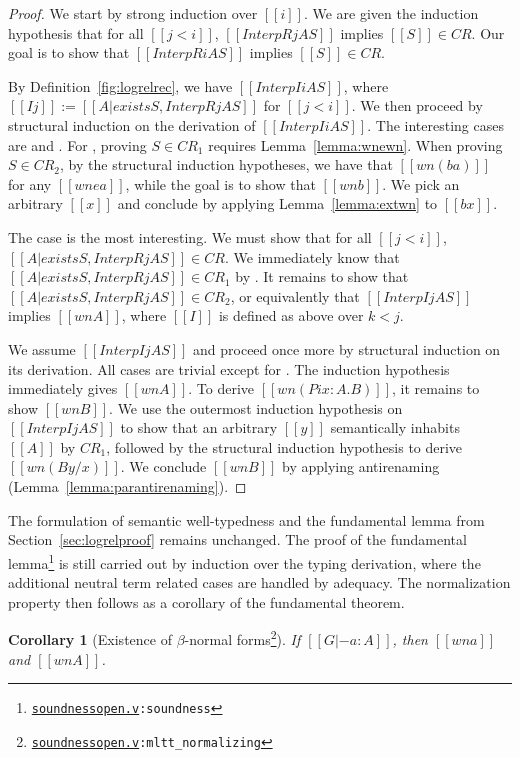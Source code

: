 \documentclass[\ifpublic nolinenum\else\fi,online,OA]{jfp}
\newcommand{\dotv}[2]{\href{#1}{\texttt{#1}}{\texttt{:#2}}}
\newcommand{\CR}{\mathit{CR}}
\newtheorem{corollary}[theorem]{Corollary}
\theoremstyle{definition}
\begin{document}
\begin{proof}
  We start by strong induction over $[[i]]$. We are given the
  induction hypothesis that for all $[[j < i]]$, $[[InterpR j A S]]$
  implies $[[S]] \in \CR$. Our goal is to show that $[[InterpR i A S]]$
  implies $[[S]] \in \CR$.

  By Definition~\ref{fig:logrelrec}, we have $[[Interp I i A S]]$,
  where $[[I j]] := [[{A | exists S , InterpR j A S}]]$ for $[[j < i]]$.
  We then proceed by structural induction on the derivation of
  $[[Interp I i A S]]$. The interesting cases are  and .
  For , proving $S \in \CR_1$ requires Lemma~\ref{lemma:wnewn}. When
  proving $S \in \CR_2$, by the structural induction hypotheses, we have that
  $[[wn (b a)]]$ for any $[[wne a]]$, while the goal is to show that $[[wn b]]$.
  We pick an arbitrary $[[x]]$ and conclude by applying Lemma~\ref{lemma:extwn}
  to $[[b x]]$.

  The  case is the most interesting. We must show that
  for all $[[j < i]]$, $[[{A | exists S, InterpR j A S}]] \in \CR$.
  We immediately know that $[[{A | exists S, InterpR j A S}]] \in \CR_1$
  by . It remains to show that
  $[[{A | exists S, InterpR j A S}]] \in \CR_2$, or equivalently that
  $[[Interp I j A S]]$ implies $[[wn A]]$, where $[[I]]$ is defined as above
  over $k < j$.
  
  We assume $[[Interp I j A S]]$ and proceed once more by structural induction
  on its derivation. All cases are trivial except for . The induction
  hypothesis immediately gives $[[wn A]]$. To derive $[[wn (Pi x : A . B)]]$,
  it remains to show $[[wn B]]$. We use the outermost induction hypothesis on
  $[[Interp I j A S]]$ to show that an arbitrary $[[y]]$ semantically inhabits
  $[[A]]$ by $\CR_1$, followed by the structural induction hypothesis to derive
  $[[wn (B {y / x})]]$. We conclude $[[wn B]]$ by applying antirenaming
  (Lemma~\ref{lemma:parantirenaming}).
\end{proof}

The formulation of semantic well-typedness and the fundamental lemma from
Section~\ref{sec:logrelproof} remains unchanged. The proof of the fundamental
lemma\footnote{\dotv{soundnessopen.v}{soundness}} is still carried out by
induction over the typing derivation, where the additional neutral term related
cases are handled by adequacy. The normalization property then follows as a
corollary of the fundamental theorem.

\begin{corollary}[Existence of $\beta$-normal forms\footnote{\dotv{soundnessopen.v}{mltt\_normalizing}}]
  \label{corollary:exbetanf}
  If $[[G |- a : A]]$, then $[[wn a]]$ and $[[wn A]]$.
\end{corollary}
\end{document}
